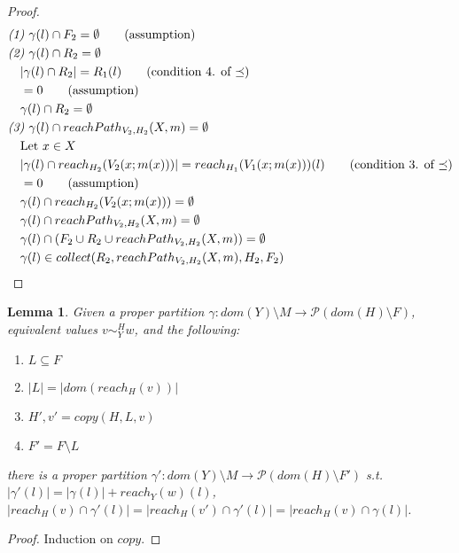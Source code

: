 \documentclass{easychair}
\newcommand{\veq}[4]{#3 \sim^{#1}_{#2} #4}
\newtheorem{lemma}[theorem]{Lemma}
\theoremstyle{definition}
\begin{document}
\begin{proof}
\begin{align*}
		&\emph{(1) } \gamma(l) \cap F_2 = \emptyset \tag{assumption}\\
		&\emph{(2) } \gamma(l) \cap R_2 = \emptyset\\
		&\quad |\gamma(l) \cap R_2| = R_1(l) \tag{condition 4. of $\preceq$}\\ 
		&\quad = 0 \tag{assumption}\\
		&\quad \gamma(l) \cap R_2 = \emptyset\\
		&\emph{(3) } \gamma(l) \cap reachPath_{V_2,H_2}(X,m) = \emptyset\\
		&\quad \text{Let } x \in X\\
		&\quad |\gamma(l) \cap reach_{H_2}(V_2(x;m(x)))| = reach_{H_1}(V_1(x;m(x)))(l) 
			\tag{condition 3. of $\preceq$}\\
		&\quad = 0 \tag{assumption}\\
		&\quad\gamma(l) \cap reach_{H_2}(V_2(x;m(x))) = \emptyset\\
		&\quad\gamma(l) \cap reachPath_{V_2,H_2}(X,m) = \emptyset\\
		&\quad\gamma(l) \cap (F_2 \cup R_2 \cup reachPath_{V_2,H_2}(X,m)) = \emptyset\\
		&\quad\gamma(l) \in collect(R_2,reachPath_{V_2,H_2}(X,m),H_2,F_2)
	\end{align*}
\end{proof}

\begin{lemma}\label{itm:copyRel}
	Given  a proper partition $\gamma : dom(Y) \setminus M \to \mathcal{P}(dom(H)\setminus F)$, 
	equivalent values $\veq{H}{Y}{v}{w}$, and the 
	following:
	\begin{enumerate}
		\item $L \subseteq F$
		\item $|L| = |dom(reach_H(v))|$
		\item $H',v' = copy(H,L,v)$
		\item $F' =	F \setminus L$
	\end{enumerate}
	there is a proper partition $\gamma' : dom(Y) \setminus M \to \mathcal{P}(dom(H) \setminus F')$ 
	s.t.
	$|\gamma'(l)| = |\gamma(l)| + reach_Y(w)(l)$, 
	$|reach_H(v) \cap \gamma'(l)| = |reach_H(v') \cap \gamma'(l)| = |reach_H(v) \cap \gamma(l)|$.
\end{lemma}

\begin{proof}
	Induction on $copy$.
\end{proof}
\end{document}
